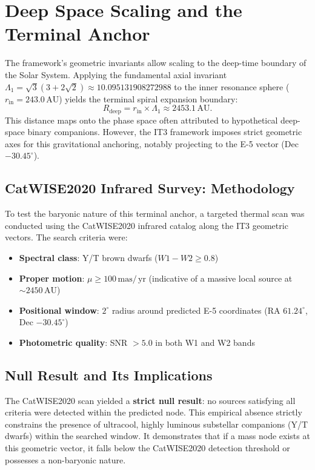 \documentclass[11pt,a4paper]{article}
\theoremstyle{remark}
\newcommand{\AU}{\,\mathrm{AU}}
\newcommand{\mas}{\,\mathrm{mas}}
\newcommand{\yr}{\,\mathrm{yr}}
\newcommand{\Lone}{\Lambda_1}
\newcommand{\LoneVal}{10.095131908272988}
\begin{document}
\section{Deep Space Scaling and the Terminal Anchor}

The framework's geometric invariants allow scaling to the deep-time boundary of the Solar System. Applying the fundamental axial invariant $\Lone = \sqrt{3}(3+2\sqrt{2}) \approx \LoneVal$ to the inner resonance sphere ($r_{\text{in}} = 243.0\AU$) yields the terminal spiral expansion boundary:
\begin{equation}
    R_{\text{deep}} = r_{\text{in}} \times \Lone \approx 2453.1\AU.
    \label{eq:deep_radius}
\end{equation}
This distance maps onto the phase space often attributed to hypothetical deep-space binary companions. However, the IT3 framework imposes strict geometric axes for this gravitational anchoring, notably projecting to the E-5 vector (Dec $-30.45^\circ$).

\subsection{CatWISE2020 Infrared Survey: Methodology}

To test the baryonic nature of this terminal anchor, a targeted thermal scan was conducted using the CatWISE2020 infrared catalog \cite{catwise2020} along the IT3 geometric vectors. The search criteria were:
\begin{itemize}[leftmargin=2em]
    \item \textbf{Spectral class}: Y/T brown dwarfs ($W1-W2 \ge 0.8$)
    \item \textbf{Proper motion}: $\mu \ge 100\mas/\yr$ (indicative of a massive local source at $\sim 2450\AU$)
    \item \textbf{Positional window}: $2^\circ$ radius around predicted E-5 coordinates (RA $61.24^\circ$, Dec $-30.45^\circ$)
    \item \textbf{Photometric quality}: SNR $> 5.0$ in both W1 and W2 bands
\end{itemize}

\subsection{Null Result and Its Implications}

The CatWISE2020 scan yielded a \textbf{strict null result}: no sources satisfying all criteria were detected within the predicted node. This empirical absence strictly constrains the presence of ultracool, highly luminous substellar companions (Y/T dwarfs) within the searched window. It demonstrates that if a mass node exists at this geometric vector, it falls below the CatWISE2020 detection threshold or possesses a non-baryonic nature.
\end{document}
